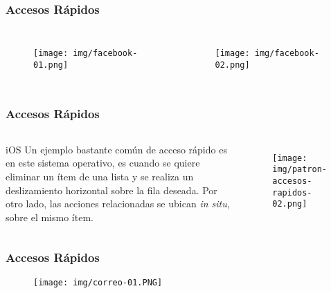 \documentclass{beamer}
\begin{document}

\begin{frame}
\frametitle{Accesos Rápidos}

\begin{columns}[c] %

\begin{figure}[H]
  \centering
  \texttt{[image: img/facebook-01.png]}
\end{figure}

\begin{figure}[H]
  \centering
  \texttt{[image: img/facebook-02.png]}
\end{figure}

\end{columns}
\end{frame}


\begin{frame}
\frametitle{Accesos Rápidos}

\begin{columns}[c] %

\begin{block}{iOS}
\justify
Un ejemplo bastante común de acceso rápido es en este sistema operativo, es cuando se quiere eliminar un ítem de una lista y se realiza un deslizamiento horizontal sobre la fila deseada. Por otro lado, las acciones relacionadas se ubican \textit{in situ}, sobre el mismo ítem.
\end{block}

\begin{figure}[H]
  \centering
  \texttt{[image: img/patron-accesos-rapidos-02.png]}
\end{figure}
\end{columns}

\end{frame}

\begin{frame}
\frametitle{Accesos Rápidos}

\begin{figure}[H]
  \centering
  \texttt{[image: img/correo-01.PNG]}
\end{figure}

\end{frame}
\end{document}
